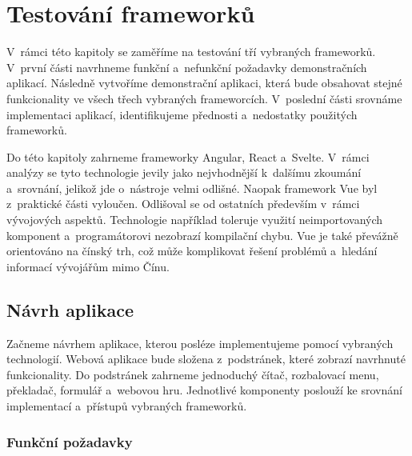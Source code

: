 \section{Testování frameworků}

V~rámci této kapitoly se zaměříme na testování tří vybraných frameworků. V~první části navrhneme funkční a~nefunkční požadavky demonstračních aplikací. 
Následně vytvoříme demonstrační aplikaci, která bude obsahovat stejné funkcionality ve všech třech vybraných frameworcích. 
V~poslední části srovnáme implementaci aplikací, identifikujeme přednosti a~nedostatky použitých frameworků.

Do této kapitoly zahrneme frameworky Angular, React a~Svelte. V~rámci analýzy se tyto technologie jevily jako nejvhodnější k~dalšímu zkoumání a~srovnání, jelikož jde o~nástroje velmi odlišné. 
Naopak framework Vue byl z~praktické části vyloučen. Odlišoval se od ostatních především v~rámci vývojových aspektů. 
Technologie například toleruje využití neimportovaných komponent a~programátorovi nezobrazí kompilační chybu. 
Vue je také převážně orientováno na čínský trh, což může komplikovat řešení problémů a~hledání informací vývojářům mimo Čínu.

\subsection{Návrh aplikace}

Začneme návrhem aplikace, kterou posléze implementujeme pomocí vybraných technologií. 
Webová aplikace bude složena z~podstránek, které zobrazí navrhnuté funkcionality. 
Do podstránek zahrneme jednoduchý čítač, rozbalovací menu, překladač, formulář a~webovou hru. 
Jednotlivé komponenty poslouží ke srovnání implementací a~přístupů vybraných frameworků.

\subsubsection{Funkční požadavky}

